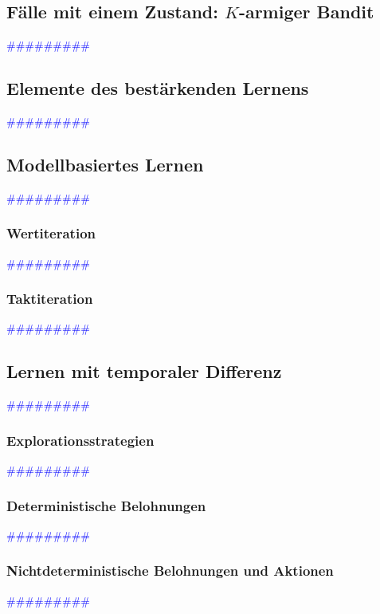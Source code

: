 \documentclass{article}
\begin{document}
  \subsection{Fälle mit einem Zustand: $K$-armiger Bandit} %
      \textcolor{blue}{\#\#\#\#\#\#\#\#\#}
  \subsection{Elemente des bestärkenden Lernens} %
      \textcolor{blue}{\#\#\#\#\#\#\#\#\#}
  \subsection{Modellbasiertes Lernen} %
      \textcolor{blue}{\#\#\#\#\#\#\#\#\#}
    \subsubsection{Wertiteration} %
      \textcolor{blue}{\#\#\#\#\#\#\#\#\#}
    \subsubsection{Taktiteration} %
      \textcolor{blue}{\#\#\#\#\#\#\#\#\#}
  \subsection{Lernen mit temporaler Differenz} %
      \textcolor{blue}{\#\#\#\#\#\#\#\#\#}
    \subsubsection{Explorationsstrategien} %
      \textcolor{blue}{\#\#\#\#\#\#\#\#\#}
    \subsubsection{Deterministische Belohnungen} %
      \textcolor{blue}{\#\#\#\#\#\#\#\#\#}
    \subsubsection{Nichtdeterministische Belohnungen und Aktionen} %
      \textcolor{blue}{\#\#\#\#\#\#\#\#\#}
\end{document}
